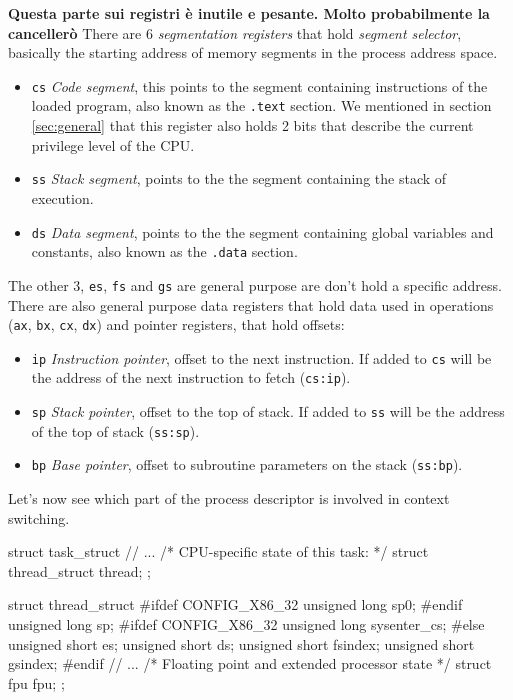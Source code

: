 \documentclass[10pt]{book}
\begin{document}
\textbf{Questa parte sui registri è inutile e pesante. Molto probabilmente la cancellerò}
There are 6 \textit{segmentation registers} that hold \textit{segment selector}, basically the starting address of memory segments in the process address space.
\begin{itemize}
    \item \verb|cs| \textit{Code segment}, this points to the segment containing instructions of the loaded program, also known as the \verb|.text| section. We mentioned in section \ref{sec:general} that this register also holds 2 bits that describe the current privilege level of the CPU.
    \item \verb|ss| \textit{Stack segment}, points to the the segment containing the stack of execution.
    \item \verb|ds| \textit{Data segment}, points to the the segment containing global variables and constants, also known as the \verb|.data| section.
\end{itemize}
The other 3, \verb|es|, \verb|fs| and \verb|gs| are general purpose are don't hold a specific address. There are also general purpose data registers that hold data used in operations (\verb|ax|, \verb|bx|, \verb|cx|, \verb|dx|) and pointer registers, that hold offsets:
\begin{itemize}
    \item \verb|ip| \textit{Instruction pointer}, offset to the next instruction. If added to \verb|cs| will be the address of the next instruction to fetch (\verb|cs:ip|).
    \item \verb|sp| \textit{Stack pointer}, offset to the top of stack. If added to \verb|ss| will be the address of the top of stack (\verb|ss:sp|).
    \item \verb|bp| \textit{Base pointer}, offset to subroutine parameters on the stack (\verb|ss:bp|).
\end{itemize}
Let's now see which part of the process descriptor is involved in context switching.
\begin{code}
struct task_struct {
    // ...
    /* CPU-specific state of this task: */
    struct thread_struct    thread;
};
\end{code}
\begin{code}
struct thread_struct {
#ifdef CONFIG_X86_32
    unsigned long	sp0;
#endif
    unsigned long	sp;
#ifdef CONFIG_X86_32
    unsigned long	sysenter_cs;
#else
    unsigned short	es;
    unsigned short	ds;
    unsigned short	fsindex;
    unsigned short        gsindex;
#endif
    // ...
    /* Floating point and extended processor state */
    struct fpu      fpu;
};
\end{code}
\end{document}
